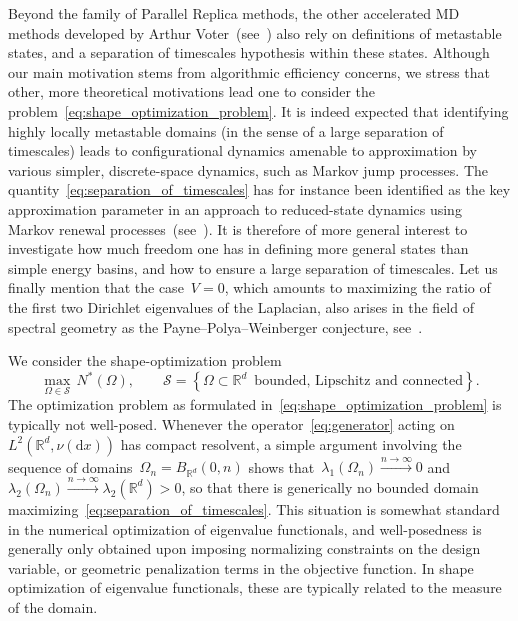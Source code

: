 \documentclass[a4]{article}
\renewcommand{\d}{\mathrm{d}}
\newcommand{\R}{\mathbb{R}}
\newcommand{\1}{\mathbbm 1}
\begin{document}
    Beyond the family of Parallel Replica methods, the other accelerated MD methods developed by Arthur Voter~(see~\cite{V97,SV00}) also rely on definitions of metastable states, and a separation of timescales hypothesis within these states.
    Although our main motivation stems from algorithmic efficiency concerns, we stress that other, more theoretical motivations lead one to consider the problem~\eqref{eq:shape_optimization_problem}.
    It is indeed expected that identifying highly locally metastable domains (in the sense of a large separation of timescales) leads to configurational dynamics amenable to approximation by various simpler, discrete-space dynamics, such as Markov jump processes.  The quantity~\eqref{eq:separation_of_timescales} has for instance been identified as the key approximation parameter in  an approach to reduced-state dynamics using Markov renewal processes~(see~\cite{AJP23}).
    It is therefore of more general interest to investigate how much freedom one has in defining more general states than simple energy basins, and how to ensure a large separation of timescales.
    Let us finally mention that the case~$V=0$, which amounts to maximizing the ratio of the first two Dirichlet eigenvalues of the Laplacian, also arises in the field of spectral geometry as the Payne--Polya--Weinberger conjecture, see~\cite{PPW56,AB92}.
    
    We consider the shape-optimization problem
    \begin{equation}
        \label{eq:shape_optimization_problem}
        \underset{\Omega\in \mathcal S}{\max}\,N^*(\Omega),\qquad \mathcal S=\left\{\Omega\subset \R^d\,\text{ bounded, Lipschitz and connected}\right\}.
    \end{equation}
    The optimization problem as formulated in~\eqref{eq:shape_optimization_problem} is typically not well-posed. Whenever the operator~\eqref{eq:generator} acting on~$L^2(\R^d,\nu(\d x))$ has compact resolvent, a simple argument involving the sequence of domains~$\Omega_n = B_{\R^d}(0,n)$ shows that~$\lambda_1(\Omega_n)\xrightarrow{n\to\infty}0$ and~$\lambda_2(\Omega_n)\xrightarrow{n\to\infty}\lambda_2(\R^d)>0$, so that there is generically no bounded domain maximizing~\eqref{eq:separation_of_timescales}.
    This situation is somewhat standard in the numerical optimization of eigenvalue functionals, and well-posedness is generally only obtained upon imposing normalizing constraints on the design variable, or geometric penalization terms in the objective function. In shape optimization of eigenvalue functionals, these are typically related to the measure of the domain.
\end{document}
